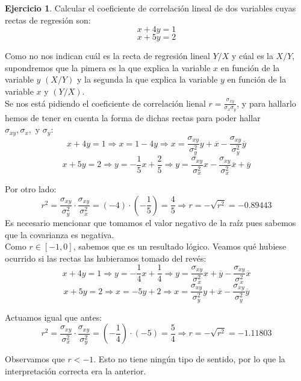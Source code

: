 \documentclass[a4paper, 12pt]{article}
\theoremstyle{definition}
\newtheorem{ej}{Ejercicio}
\begin{document}
\begin{ej}
Calcular el coeficiente de correlación lineal de dos variables cuyas rectas de regresión son:
\[
	x + 4y = 1
\]
\[
	x + 5y = 2
\]

Como no nos indican cuál es la recta de regresión lineal \(Y/X\) y cúal es la \(X/Y\), supondremos que la pimera es la que explica la variable \(x\) en función de la variable \(y\) \((X/Y)\) y la segunda la que explica la variable \(y\) en función de la variable \(x\) y \((Y/X)\). \\

Se nos está pidiendo el coeficiente de correlación lienal \(r = \frac{\sigma_{xy}}{\sigma_x \sigma_y}\), y para hallarlo hemos de tener en cuenta la forma de dichas rectas para poder hallar \(\sigma_{xy}, \sigma_x, \text{ y } \sigma_y\):
\[
	x + 4y = 1 \Rightarrow x = 1 - 4y \Rightarrow x = \frac{\sigma_{xy}}{\sigma_y^2}y + \overline{x} - \frac{\sigma_{xy}}{\sigma_y^2} \overline{y}
\]
\[
	x +5y = 2 \Rightarrow y = - \frac{1}{5}x + \frac{2}{5} \Rightarrow y = \frac{\sigma_{xy}}{\sigma_x^2}x -\frac{\sigma_{xy}}{\sigma_x^2} \overline{x} + \overline{y}
\]

Por otro lado:
\[
	r^2 = \frac{\sigma_{xy}}{\sigma_y^2} \cdot \frac{\sigma_{xy}}{\sigma_x^2} = (-4) \cdot (-\frac{1}{5}) = \frac{4}{5} \Rightarrow r = -\sqrt{r^2} = -0.89443
\]
Es necesario mencionar que tomamos el valor negativo de la raíz pues sabemos que la covarianza es negativa. \\

Como \(r \in [-1, 0]\), sabemos que es un resultado lógico. Veamos qué hubiese ocurrido si las rectas las hubieramos tomado del revés:
\[
	x + 4y = 1 \Rightarrow y = - \frac{1}{4}x + \frac{1}{4} \Rightarrow y = \frac{\sigma_{xy}}{\sigma_x^2}x + \overline{y} - \frac{\sigma_{xy}}{\sigma_x^2} \overline{x}
\]
\[
	x + 5y = 2 \Rightarrow x = -5y +2 \Rightarrow x = \frac{\sigma_{xy}}{\sigma_y^2}y + \overline{x} - \frac{\sigma_{xy}}{\sigma_y^2} \overline{y}
\]

Actuamos igual que antes:
\[
	r^2 = \frac{\sigma_{xy}}{\sigma_x^2} \cdot \frac{\sigma_{xy}}{\sigma_y^2} = (-\frac{1}{4}) \cdot (-5) = \frac{5}{4} \Rightarrow r = -\sqrt{r^2} = -1.11803
\]

Observamos que \(r < -1\). Esto no tiene ningún tipo de sentido, por lo que la interpretación correcta era la anterior.
\end{ej}
\end{document}
